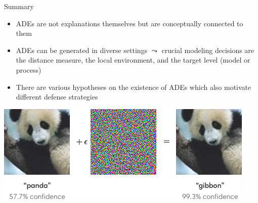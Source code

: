 \documentclass[11pt,compress,t,notes=noshow, aspectratio=169, xcolor=table]{beamer}
\begin{document}

\begin{vbframe}[c]{Summary}
\begin{itemize}
    \item ADEs are not explanations themselves but are conceptually connected to them
    \item ADEs can be generated in diverse settings $\leadsto$ crucial modeling decisions are the distance measure, the local environment, and the target level (model or process)
    \item There are various hypotheses on the existence of ADEs which also motivate different defense strategies
\end{itemize}
\begin{center}
    \includegraphics[width = .6\textwidth]{figure/AEpanda_simple.png}
    
    {}
\end{center}
\end{vbframe}
\end{document}
